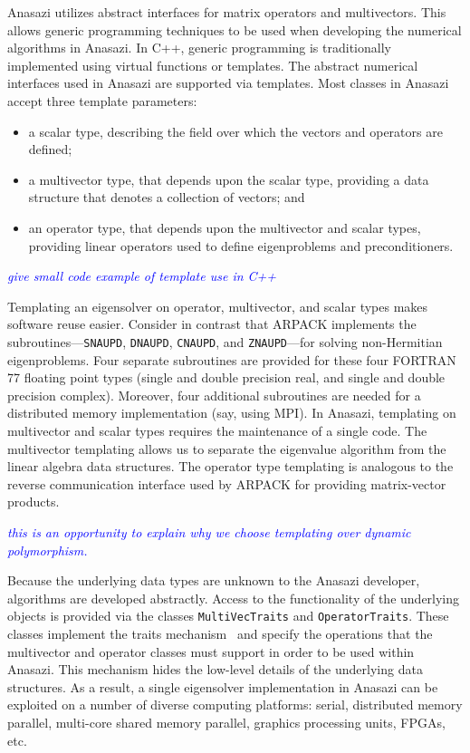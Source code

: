\documentclass[acmtoms]{acmtrans2m}
\newcounter{algorithm}
\newcommand{\aspace}[1]{\texttt{#1}}
\newcommand{\cbcomm}[1]{\textcolor{blue}{\emph{#1}}}
\begin{document}
Anasazi utilizes abstract interfaces for matrix operators and
multivectors. This allows generic programming techniques to be used
when developing the numerical algorithms in Anasazi. In C++, generic
programming is traditionally implemented using virtual
functions or templates. The abstract numerical interfaces used
in Anasazi are supported via templates. Most classes in Anasazi accept
three template parameters:
\begin{itemize}
\item
a scalar type, describing the field over which the vectors and
operators are defined;
\item
a multivector type, that depends upon the scalar type, providing a
data structure that denotes a collection of vectors; and
\item
an operator type, that depends upon the multivector and scalar types,
providing linear operators used to define eigenproblems and
preconditioners.
\end{itemize}

\cbcomm{give small code example of template use in C++}

Templating an eigensolver on operator, multivector, and scalar types makes software reuse
easier. Consider in contrast that ARPACK implements the subroutines---\texttt{SNAUPD},
\texttt{DNAUPD}, \texttt{CNAUPD}, and \texttt{ZNAUPD}---for solving non-Hermitian
eigenproblems. Four separate subroutines are provided for these four FORTRAN 77 floating
point types (single and double precision real, and single and double precision complex).
Moreover, four additional subroutines are needed for a distributed memory implementation
(say, using MPI). In Anasazi, templating on multivector and scalar types requires the
maintenance of a single code. The multivector templating allows us to separate the
eigenvalue algorithm from the linear algebra data structures. The operator type templating
is analogous to the reverse communication interface used by ARPACK for providing
matrix-vector products.

\cbcomm{this is an opportunity to explain why we choose templating
over dynamic polymorphism.}

Because the underlying data types are unknown to the Anasazi
developer, algorithms are developed abstractly. Access to the
functionality of the underlying objects is provided via the classes
\aspace{MultiVecTraits} and \aspace{OperatorTraits}. These classes
implement the traits mechanism~\cite{myer:95} and specify the
operations that the multivector and operator classes must support in
order to be used within Anasazi. This mechanism hides the low-level
details of the underlying data structures.  As a result, a single
eigensolver implementation in Anasazi can be exploited on a number of
diverse computing platforms: serial, distributed memory parallel,
multi-core shared memory parallel, graphics processing units, FPGAs,
etc.
\end{document}
